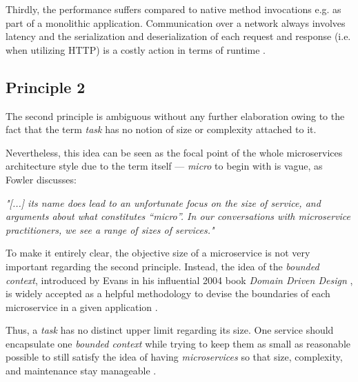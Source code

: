 \documentclass[12pt,a4paper]{report}
\begin{document}
Thirdly, the performance suffers compared to native method invocations e.g.
as part of a monolithic application. Communication over a network always
involves latency and the serialization and deserialization
of each request and response (i.e. when utilizing HTTP) is a costly action
in terms of runtime \cite{newman2015building}.


\subsection{Principle 2} \label{subsect:ms-principle-2}
The second principle is ambiguous without any further elaboration owing to
the fact that the term \textit{task} has no notion of size or complexity
attached to it.

Nevertheless, this idea can be seen as the focal point of the whole microservices
architecture style due to the term itself --- \textit{micro} to begin with
is vague, as Fowler discusses:
\begin{displayquote}
\emph{"[...] its name does lead to an unfortunate focus on the size of service,
and arguments about what constitutes “micro”.
In our conversations with microservice practitioners,
we see a range of sizes of services."}~\cite{ms-fowler}
\end{displayquote}
To make it entirely clear, the objective size of a microservice is not very
important regarding the second principle. Instead, the idea of the
\textit{bounded context}, introduced by Evans in his influential 2004 book
\textit{Domain Driven Design} \cite{evans2004ddd}, is widely accepted as
a helpful methodology to devise the boundaries of each microservice
in a given application \cite{newman2015building, ms-fowler}.

Thus, a \textit{task} has no distinct upper limit regarding its size.
One service should encapsulate one \textit{bounded context} while trying to
keep them as small as reasonable possible to still satisfy the idea of having
\textit{microservices} so that size, complexity, and maintenance stay manageable
\cite{newman2015building, ms-fowler}.
\end{document}
